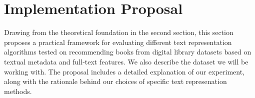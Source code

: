\documentclass[\myFontSize,a4paper,oneside,hidelinks]{article}
\begin{document}
\clearpage
%
%




\section{Implementation Proposal}
Drawing from the theoretical foundation in the second section, this section proposes a practical framework for evaluating different text representation algorithms tested on recommending books from digital library datasets based on textual metadata and full-text features. We also describe the dataset we will be working with. The proposal includes a detailed explanation of our experiment, along with the rationale behind our choices of specific text represenation methods.
%
%
%
\end{document}
